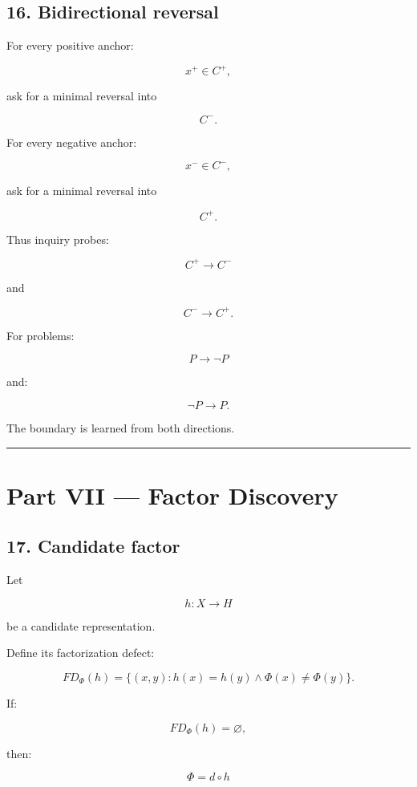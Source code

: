 \documentclass[
]{article}
\begin{document}
\subsection{16. Bidirectional reversal}\label{bidirectional-reversal}

For every positive anchor:

\[
x^+\in C^+,
\]

ask for a minimal reversal into

\[
C^-.
\]

For every negative anchor:

\[
x^-\in C^-,
\]

ask for a minimal reversal into

\[
C^+.
\]

Thus inquiry probes:

\[
\boxed{
C^+\to C^-
}
\]

and

\[
\boxed{
C^-\to C^+.
}
\]

For problems:

\[
P\to\neg P
\]

and:

\[
\neg P\to P.
\]

The boundary is learned from both directions.

\begin{center}\rule{0.5\linewidth}{0.5pt}\end{center}

\section{Part VII --- Factor Discovery}\label{part-vii-factor-discovery}

\subsection{17. Candidate factor}\label{candidate-factor}

Let

\[
h:X\to H
\]

be a candidate representation.

Define its factorization defect:

\[
\boxed{
FD_\Phi(h)
=
\{
(x,y):
h(x)=h(y)
\land
\Phi(x)\neq\Phi(y)
\}.
}
\]

If:

\[
FD_\Phi(h)=\varnothing,
\]

then:

\[
\boxed{
\Phi=d\circ h
}
\]
\end{document}
